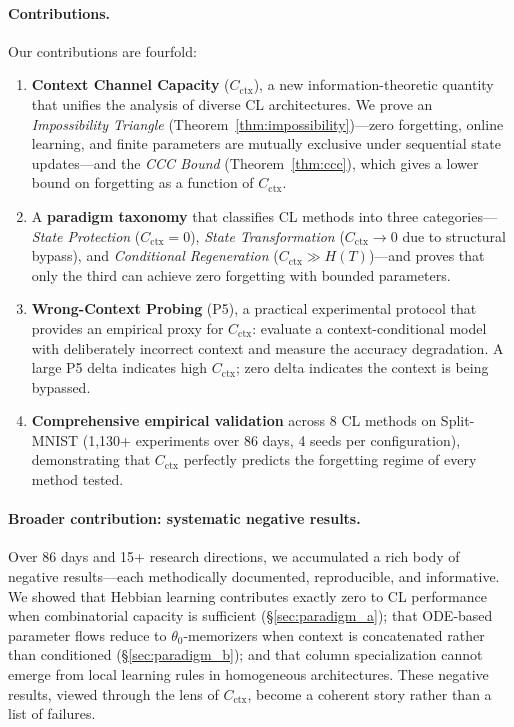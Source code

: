 \documentclass{article}
\begin{document}
\paragraph{Contributions.} Our contributions are fourfold:
\begin{enumerate}
    \item \textbf{Context Channel Capacity} ($C_\mathrm{ctx}$), a new information-theoretic quantity that unifies the analysis of diverse CL architectures. We prove an \emph{Impossibility Triangle} (Theorem~\ref{thm:impossibility})---zero forgetting, online learning, and finite parameters are mutually exclusive under sequential state updates---and the \emph{CCC Bound} (Theorem~\ref{thm:ccc}), which gives a lower bound on forgetting as a function of $C_\mathrm{ctx}$.

    \item A \textbf{paradigm taxonomy} that classifies CL methods into three categories---\emph{State Protection} ($C_\mathrm{ctx} = 0$), \emph{State Transformation} ($C_\mathrm{ctx} \to 0$ due to structural bypass), and \emph{Conditional Regeneration} ($C_\mathrm{ctx} \gg H(T)$)---and proves that only the third can achieve zero forgetting with bounded parameters.

    \item \textbf{Wrong-Context Probing} (P5), a practical experimental protocol that provides an empirical proxy for $C_\mathrm{ctx}$: evaluate a context-conditional model with deliberately incorrect context and measure the accuracy degradation. A large P5 delta indicates high $C_\mathrm{ctx}$; zero delta indicates the context is being bypassed.

    \item \textbf{Comprehensive empirical validation} across 8 CL methods on Split-MNIST (1,130+ experiments over 86 days, 4 seeds per configuration), demonstrating that $C_\mathrm{ctx}$ perfectly predicts the forgetting regime of every method tested.
\end{enumerate}

\paragraph{Broader contribution: systematic negative results.} Over 86 days and 15+ research directions, we accumulated a rich body of negative results---each methodically documented, reproducible, and informative. We showed that Hebbian learning contributes exactly zero to CL performance when combinatorial capacity is sufficient (\S\ref{sec:paradigm_a}); that ODE-based parameter flows reduce to $\theta_0$-memorizers when context is concatenated rather than conditioned (\S\ref{sec:paradigm_b}); and that column specialization cannot emerge from local learning rules in homogeneous architectures. These negative results, viewed through the lens of $C_\mathrm{ctx}$, become a coherent story rather than a list of failures.
\end{document}
